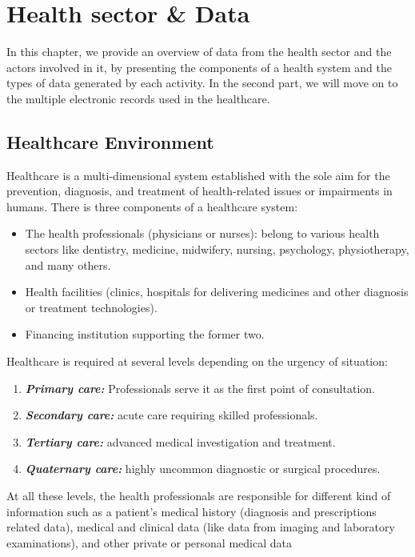 \chapter{Health sector \& Data}

In this chapter, we provide an overview of data from the health sector and the actors involved in it, by presenting the components of a health system and the types of data generated by each activity. In the second part, we will move on to the multiple electronic records used in the healthcare.

\section{Healthcare Environment}
Healthcare is a multi-dimensional system established with the sole aim for the prevention, diagnosis, and treatment of health-related issues or impairments in humans. There is three components of a healthcare system\cite{dash2019big}:
\begin{itemize}
  \renewcommand{\labelitemi}{$\bullet$}
    \item The health professionals (physicians or nurses): belong to various health sectors like dentistry, medicine, midwifery, nursing, psychology, physiotherapy, and many others.
    \item Health facilities (clinics, hospitals for delivering medicines and other diagnosis or treatment technologies).
    \item Financing institution supporting the former two.
  \end{itemize}
  Healthcare is required at several levels depending on the urgency of situation:
  \begin{enumerate}
    \item \textbf{\textit{Primary care:}} Professionals serve it as the first point of consultation.
    \item \textbf{\textit{Secondary care:}} acute care requiring skilled professionals.
    \item \textbf{\textit{Tertiary care:}} advanced medical investigation and treatment.
    \item \textbf{\textit{Quaternary care:}} highly uncommon diagnostic or surgical procedures.
  \end{enumerate}
 At all these levels, the health professionals are responsible for different kind of information such as a patient's medical history (diagnosis and prescriptions related data), medical and clinical data (like data from imaging and laboratory examinations), and other private or personal medical data


